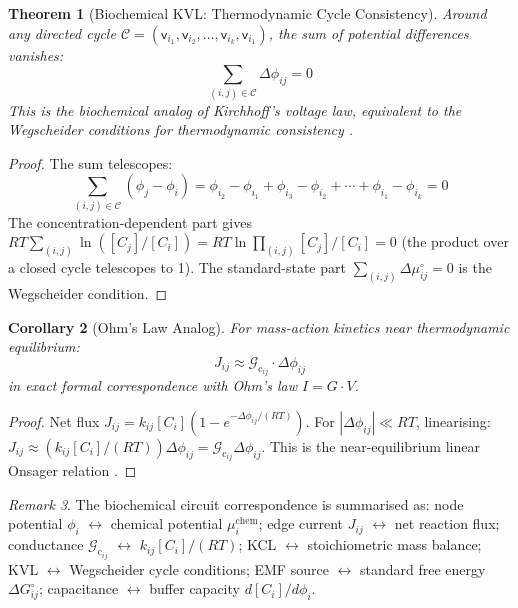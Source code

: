 \documentclass[10pt,twocolumn,a4paper]{article}
\theoremstyle{plain}
\newtheorem{theorem}{Theorem}[section]
\newtheorem{corollary}[theorem]{Corollary}
\theoremstyle{definition}
\theoremstyle{remark}
\newtheorem{remark}[theorem]{Remark}
\newcommand{\fnode}{\mathsf{v}}
\newcommand{\Gcond}{\mathcal{G}_{\mathrm{c}}}
\begin{document}
\begin{theorem}[Biochemical KVL: Thermodynamic Cycle Consistency]
\label{thm:kvl}
Around any directed cycle $\mathcal{C} = (\fnode_{i_1}, \fnode_{i_2}, \ldots, \fnode_{i_k}, \fnode_{i_1})$, the sum of potential differences vanishes:
\begin{equation}
    \sum_{(i,j) \in \mathcal{C}} \Delta\phi_{ij} = 0
    \label{eq:kvl}
\end{equation}
This is the biochemical analog of Kirchhoff's voltage law, equivalent to the Wegscheider conditions for thermodynamic consistency \citep{wegscheider1901}.
\end{theorem}

\begin{proof}
The sum telescopes:
\begin{equation}
    \sum_{(i,j) \in \mathcal{C}} (\phi_j - \phi_i) = \phi_{i_2} - \phi_{i_1} + \phi_{i_3} - \phi_{i_2} + \cdots + \phi_{i_1} - \phi_{i_k} = 0
\end{equation}
The concentration-dependent part gives $RT \sum_{(i,j)} \ln([C_j]/[C_i]) = RT \ln \prod_{(i,j)} [C_j]/[C_i] = 0$ (the product over a closed cycle telescopes to 1). The standard-state part $\sum_{(i,j)} \Delta\mu_{ij}^\circ = 0$ is the Wegscheider condition.
\end{proof}

\begin{corollary}[Ohm's Law Analog]
\label{cor:ohm}
For mass-action kinetics near thermodynamic equilibrium:
\begin{equation}
    J_{ij} \approx \Gcond_{ij} \cdot \Delta\phi_{ij}
\end{equation}
in exact formal correspondence with Ohm's law $I = G \cdot V$.
\end{corollary}

\begin{proof}
Net flux $J_{ij} = k_{ij}[C_i](1 - e^{-\Delta\phi_{ij}/(RT)})$. For $|\Delta\phi_{ij}| \ll RT$, linearising: $J_{ij} \approx (k_{ij}[C_i]/(RT))\Delta\phi_{ij} = \Gcond_{ij}\Delta\phi_{ij}$. This is the near-equilibrium linear Onsager relation \citep{onsager1931}.
\end{proof}

\begin{remark}
The biochemical circuit correspondence is summarised as: node potential $\phi_i$ $\leftrightarrow$ chemical potential $\mu_i^{\mathrm{chem}}$; edge current $J_{ij}$ $\leftrightarrow$ net reaction flux; conductance $\Gcond_{ij}$ $\leftrightarrow$ $k_{ij}[C_i]/(RT)$; KCL $\leftrightarrow$ stoichiometric mass balance; KVL $\leftrightarrow$ Wegscheider cycle conditions; EMF source $\leftrightarrow$ standard free energy $\Delta G^\circ_{ij}$; capacitance $\leftrightarrow$ buffer capacity $d[C_i]/d\phi_i$.
\end{remark}
\end{document}
